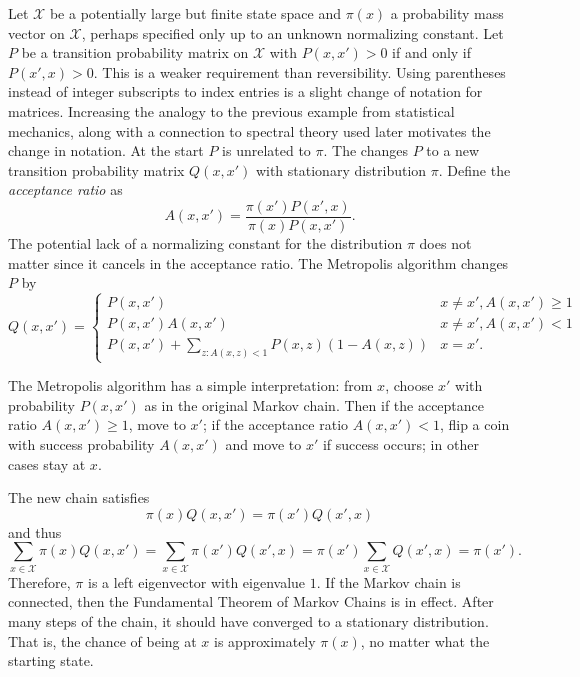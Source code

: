 \documentclass[12pt]{article}
\begin{document}
Let \( \mathcal{X} \) be a potentially large but finite state space and \(
\pi(x) \) a probability mass vector on \( \mathcal{X} \), perhaps
specified only up to an unknown normalizing constant.  Let \( P \) be a
transition probability matrix on \( \mathcal{X} \) with \( P(x,x') > 0 \)
if and only if \( P(x',x) > 0 \).  This is a weaker requirement than
reversibility.  Using parentheses instead of integer subscripts to index
entries is a slight change of notation for matrices.  Increasing the
analogy to the previous example from statistical mechanics, along with a
connection to spectral theory used later motivates the change in
notation.  At the start \( P \) is unrelated to \( \pi \).  The  changes \( P \) to a new transition probability matrix \( Q(x,x')
\) with stationary distribution \( \pi \).  Define the \emph{acceptance
ratio} as
\[
    A(x,x') = \frac{\pi(x') P(x',x)}{\pi(x) P(x,x')}.
\] The potential lack of a normalizing constant for the distribution \(
\pi \) does not matter since it cancels in the acceptance ratio.  The
Metropolis algorithm changes \( P \) by
\[
    Q(x,x') =
    \begin{cases}
        P(x,x') & x \ne x', A(x,x') \ge 1 \\
        P(x,x')A(x,x') & x \ne x', A(x,x') < 1\ \\
        P(x,x') + \sum\limits_{z:A(x,z) < 1} P(x,z)(1 - A(x,z)) & x =
        x'.
    \end{cases}
\]

The Metropolis algorithm has a simple interpretation:  from \( x \),
choose \( x' \) with probability \( P(x,x') \) as in the original Markov
chain.  Then if the acceptance ratio \( A(x,x') \ge 1 \), move to \( x' \);
if the acceptance ratio \( A(x,x') < 1 \), flip a coin with success
probability \( A(x,x') \) and move to \( x' \) if success occurs; in
other cases stay at \( x \).

The new chain satisfies
\[
    \pi(x) Q(x,x') = \pi(x') Q(x',x)
\] and thus
\[
    \sum\limits_{x \in \mathcal{X}} \pi(x) Q(x,x') = \sum\limits_{x \in
    \mathcal{X}} \pi(x') Q(x',x) = \pi(x') \sum\limits_{x \in \mathcal{X}}
    Q(x',x) = \pi(x').
\] Therefore, \( \pi \) is a left eigenvector with eigenvalue \( 1 \).
If the Markov chain is connected, then the Fundamental Theorem of Markov
Chains is in effect.  After many steps of the chain, it should have
converged to a stationary distribution.  That is, the chance of being at
\( x \) is approximately \( \pi(x) \), no matter what the starting
state.
\end{document}
